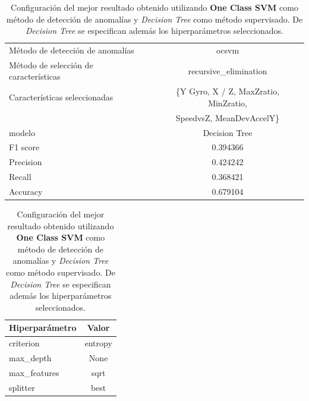 \begin{appendices}
		\begin{table}[htb]
			\centering
			\caption{Configuración del mejor resultado obtenido utilizando \textbf{One Class SVM} como método de detección de anomalías y \emph{Decision Tree}
			como método supervisado. De \emph{Decision Tree} se especifican además los hiperparámetros seleccionados.}
			\label{table:24}
			\begin{tabular}{lc}
				\toprule
					  Método de detección de anomalías &                                              ocsvm \\
				Método de selección de características &                              recursive\_elimination \\
						 Características seleccionadas & \{Y Gyro, X / Z, MaxZratio, MinZratio, \\
						 							   &   SpeedvsZ,  MeanDevAccelY\}\\
												modelo &                                      Decision Tree \\
											  F1 score &                                           0.394366 \\
											 Precision &                                           0.424242 \\
												Recall &                                           0.368421 \\
											  Accuracy &                                           0.679104 \\
				\bottomrule
			\end{tabular}
			\newline
			\newline

			\begin{tabular}{lc}
				\toprule
				Hiperparámetro &   Valor \\
				\midrule
					 criterion & entropy \\
					 max\_depth &    None \\
				  max\_features &    sqrt \\
					  splitter &    best \\
				\bottomrule
			\end{tabular}
			
		\end{table}


\end{appendices}
